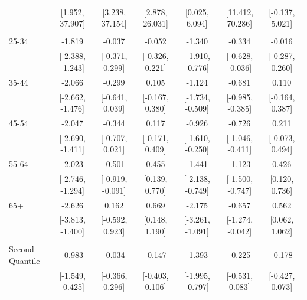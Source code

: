 \documentclass[
  10,
  letterpaper,
  DIV=11,
  numbers=noendperiod]{scrartcl}
\begin{document}
\begin{table}
\begin{tabular}[t]{lcccccc}
\hspace{1em} & {}[1.952, 37.907] & {}[3.238, 37.154] & {}[2.878, 26.031] & {}[0.025, 6.094] & {}[11.412, 70.286] & {}[-0.137, 5.021]\\
\addlinespace[0.3em]
\multicolumn{7}{l}{\cellcolor[HTML]{3498DB}{\textbf{Age}}}\\
\hspace{1em}25-34 & -1.819 & -0.037 & -0.052 & -1.340 & -0.334 & -0.016\\
\hspace{1em} & {}[-2.388, -1.243] & {}[-0.371, 0.299] & {}[-0.326, 0.221] & {}[-1.910, -0.776] & {}[-0.628, -0.036] & {}[-0.287, 0.260]\\
\hspace{1em}35-44 & -2.066 & -0.299 & 0.105 & -1.124 & -0.681 & 0.110\\
\hspace{1em} & {}[-2.662, -1.476] & {}[-0.641, 0.039] & {}[-0.167, 0.380] & {}[-1.734, -0.509] & {}[-0.985, -0.385] & {}[-0.164, 0.387]\\
\hspace{1em}45-54 & -2.047 & -0.344 & 0.117 & -0.926 & -0.726 & 0.211\\
\hspace{1em} & {}[-2.690, -1.411] & {}[-0.707, 0.021] & {}[-0.171, 0.409] & {}[-1.610, -0.250] & {}[-1.046, -0.411] & {}[-0.073, 0.494]\\
\hspace{1em}55-64 & -2.023 & -0.501 & 0.455 & -1.441 & -1.123 & 0.426\\
\hspace{1em} & {}[-2.746, -1.294] & {}[-0.919, -0.091] & {}[0.139, 0.770] & {}[-2.138, -0.749] & {}[-1.500, -0.747] & {}[0.120, 0.736]\\
\hspace{1em}65+ & -2.626 & 0.162 & 0.669 & -2.175 & -0.657 & 0.562\\
\hspace{1em} & {}[-3.813, -1.400] & {}[-0.592, 0.923] & {}[0.148, 1.190] & {}[-3.261, -1.091] & {}[-1.274, -0.042] & {}[0.062, 1.062]\\
\addlinespace[0.3em]
\multicolumn{7}{l}{\cellcolor[HTML]{3498DB}{\textbf{Income}}}\\
\hspace{1em}Second Quantile & -0.983 & -0.034 & -0.147 & -1.393 & -0.225 & -0.178\\
\hspace{1em} & {}[-1.549, -0.425] & {}[-0.366, 0.296] & {}[-0.403, 0.106] & {}[-1.995, -0.797] & {}[-0.531, 0.083] & {}[-0.427, 0.073]\\

\end{tabular}
\end{table}
\end{document}
